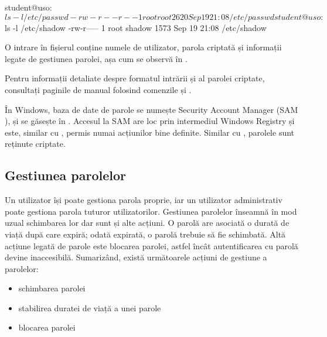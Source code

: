 \begin{screen}[caption={Permisiuni de acces pe fișierele de parole},label={lst:user:shadow-perm}]
student@uso:~$ ls -l /etc/passwd
-rw-r--r-- 1 root root 2620 Sep 19 21:08 /etc/passwd
student@uso:~$ ls -l /etc/shadow
-rw-r----- 1 root shadow 1573 Sep 19 21:08 /etc/shadow
\end{screen}

O intrare în fișierul  conține numele de utilizator, parola criptată
și informații legate de gestiunea parolei, așa cum se observă în .


Pentru informații detaliate despre formatul intrării și al parolei criptate,
consultați paginile de manual folosind comenzile  și .

În Windows, baza de date de parole se numește Security Account Manager (SAM
), și se găsește în
. Accesul la SAM are loc prin intermediul
Windows Registry și este, similar cu , permis numai acțiunilor bine
definite. Similar cu , parolele sunt reținute criptate.

\subsection{Gestiunea parolelor}
\label{sec:user:manage-passwords}

Un utilizator își poate gestiona parola proprie, iar un utilizator administrativ
poate gestiona parola tuturor utilizatorilor. Gestiunea parolelor înseamnă în
mod uzual schimbarea lor dar sunt și alte acțiuni. O parolă are asociată o
durată de viață după care expiră; odată expirată, o parolă trebuie să fie
schimbată. Altă acțiune legată de parole este blocarea parolei, astfel încât
autentificarea cu parolă devine inaccesibilă. Sumarizând, există următoarele
acțiuni de gestiune a parolelor:

\begin{itemize}
	\item schimbarea parolei
	\item stabilirea duratei de viață a unei parole
	\item blocarea parolei
\end{itemize}

